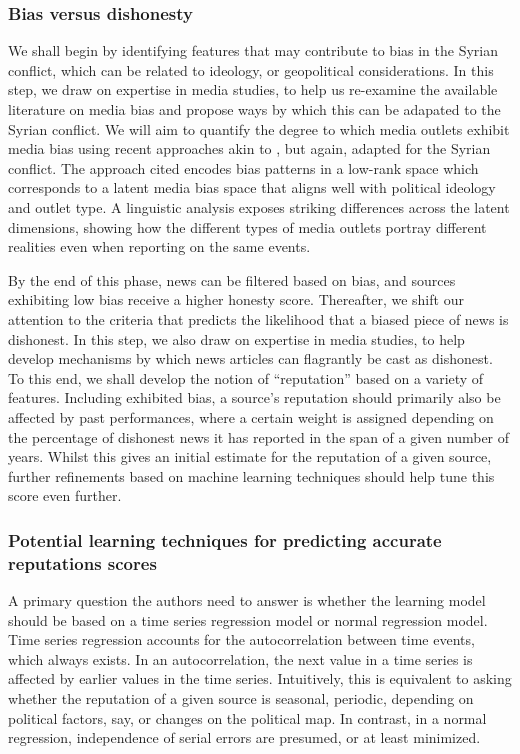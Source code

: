 \subsubsection{Bias versus dishonesty}
 
We shall begin by identifying features that may contribute to bias in the Syrian conflict, which can be related to ideology, or geopolitical considerations. In this step, we draw on expertise in media studies, to help us re-examine the available literature on media bias and propose ways by which this can be adapated to the Syrian conflict. We will aim to quantify the degree to which media outlets exhibit media bias using recent approaches akin to \cite{NSZML15}, but again, adapted for the Syrian conflict. The approach cited encodes bias patterns in a low-rank space which corresponds to a latent media bias space that aligns well with political ideology and outlet type. A linguistic analysis
exposes striking differences across the latent dimensions, showing how the different types of media outlets portray different realities even when reporting on the same events.

By the end of this phase, news can be filtered based on bias, and sources exhibiting low bias receive a higher honesty score. Thereafter, we shift our attention to the criteria that predicts the likelihood that a biased piece of news is dishonest. 
In this step, we also draw on expertise in media studies, to help develop mechanisms by which news articles can flagrantly be cast as dishonest. To this end, we shall develop the notion of ``reputation'' based on a variety of features. Including exhibited bias, a source's reputation should primarily also be affected by past performances, where a certain weight is assigned depending on the percentage of dishonest news it has reported in the span of a given number of years. Whilst this gives an initial estimate for the reputation of a given source, further refinements based on machine learning techniques should help tune this score even further.

\subsubsection{Potential learning techniques for predicting accurate reputations scores}

A primary question the authors need to answer is whether the learning model should be based on a time series regression model or normal regression model. Time series regression accounts for the autocorrelation between time events, which always exists. In an autocorrelation, the next value in a time series is affected by earlier values in the time series. Intuitively, this is equivalent to asking whether the reputation of a given source is seasonal, periodic, depending on political factors, say, or changes on the political map. In contrast, in a normal regression, independence of serial errors are presumed, or at least minimized. 

